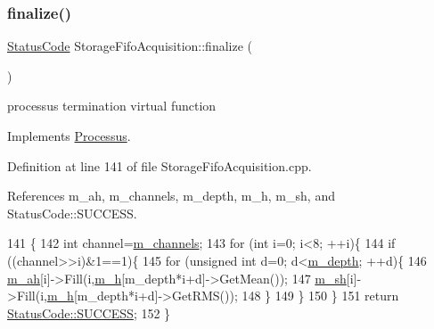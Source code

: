 \subsubsection{\texorpdfstring{finalize()}{finalize()}}
{\footnotesize\ttfamily \hyperlink{classStatusCode}{Status\+Code} Storage\+Fifo\+Acquisition\+::finalize (\begin{DoxyParamCaption}{ }\end{DoxyParamCaption})\hspace{0.3cm}{\ttfamily [virtual]}}

processus termination virtual function 

Implements \hyperlink{classProcessus_aba93d691f031bdb18ae4b8afb1b2e856}{Processus}.



Definition at line 141 of file Storage\+Fifo\+Acquisition.\+cpp.



References m\+\_\+ah, m\+\_\+channels, m\+\_\+depth, m\+\_\+h, m\+\_\+sh, and Status\+Code\+::\+S\+U\+C\+C\+E\+SS.


\begin{DoxyCode}
141                                               \{
142   \textcolor{keywordtype}{int} channel=\hyperlink{classStorageFifoAcquisition_ae3563f586533ac15f48c7f9c8fea3e7f}{m\_channels};
143   \textcolor{keywordflow}{for} (\textcolor{keywordtype}{int} i=0; i<8; ++i)\{
144     \textcolor{keywordflow}{if} ((channel>>i)&1==1)\{
145       \textcolor{keywordflow}{for} (\textcolor{keywordtype}{unsigned} \textcolor{keywordtype}{int} d=0; d<\hyperlink{classStorageFifoAcquisition_a6bebf76cce0ccaae599c844a69ebd19d}{m\_depth}; ++d)\{
146     \hyperlink{classStorageFifoAcquisition_ac73454f960b6224d7fe3d104b4b7a51b}{m\_ah}[i]->Fill(i,\hyperlink{classStorageFifoAcquisition_a19913cfc87da82b107e49399e3e9b754}{m\_h}[m\_depth*i+d]->GetMean());
147     \hyperlink{classStorageFifoAcquisition_ace3efa07a424f66783388ad073b31830}{m\_sh}[i]->Fill(i,\hyperlink{classStorageFifoAcquisition_a19913cfc87da82b107e49399e3e9b754}{m\_h}[m\_depth*i+d]->GetRMS());
148       \}
149     \}
150   \} 
151   \textcolor{keywordflow}{return} \hyperlink{classStatusCode_a6f565cbeadc76d14c72f047e5e85eb4badd0da38d3ba0d922efd1f4619bc37ad8}{StatusCode::SUCCESS};
152 \}
\end{DoxyCode}
\mbox{\label{classStorageFifoAcquisition_a9cf77a05d754282e7737fb439bfa835d}} 
